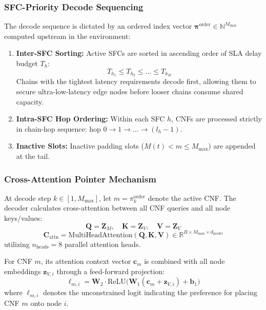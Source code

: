\documentclass[conference]{IEEEtran}
\begin{document}
\subsubsection{SFC-Priority Decode Sequencing}
The decode sequence is dictated by an ordered index vector $\boldsymbol{\pi}^{\text{order}} \in \mathbb{N}^{M_{\max}}$ computed upstream in the environment:
\begin{enumerate}
    \item \textbf{Inter-SFC Sorting:} Active SFCs are sorted in ascending order of SLA delay budget $T_h$:
    \begin{equation}
    T_{h_1} \le T_{h_2} \le \dots \le T_{h_H}
    \end{equation}
    Chains with the tightest latency requirements decode first, allowing them to secure ultra-low-latency edge nodes before looser chains consume shared capacity.
    \item \textbf{Intra-SFC Hop Ordering:} Within each SFC $h$, CNFs are processed strictly in chain-hop sequence: hop $0 \to 1 \to \dots \to (l_h - 1)$.
    \item \textbf{Inactive Slots:} Inactive padding slots ($M(t) < m \le M_{\max}$) are appended at the tail.
\end{enumerate}

\subsubsection{Cross-Attention Pointer Mechanism}
At decode step $k \in [1, M_{\max}]$, let $m = \pi_k^{\text{order}}$ denote the active CNF. The decoder calculates cross-attention between all CNF queries and all node keys/values:
\begin{equation}
\mathbf{Q} = \mathbf{Z}_M, \quad \mathbf{K} = \mathbf{Z}_V, \quad \mathbf{V} = \mathbf{Z}_V
\end{equation}
\begin{equation}
\mathbf{C}_{\text{attn}} = \text{MultiHeadAttention}(\mathbf{Q}, \mathbf{K}, \mathbf{V}) \in \mathbb{R}^{B \times M_{\max} \times d_{\text{model}}}
\end{equation}
utilizing $n_{\text{heads}} = 8$ parallel attention heads.

For CNF $m$, its attention context vector $\mathbf{c}_m$ is combined with all node embeddings $\mathbf{z}_{V, i}$ through a feed-forward projection:
\begin{equation}
\ell_{m, i} = \mathbf{W}_2 \cdot \text{ReLU}\big(\mathbf{W}_1 (\mathbf{c}_m + \mathbf{z}_{V, i}) + \mathbf{b}_1\big)
\label{eq:logits}
\end{equation}
where $\ell_{m, i}$ denotes the unconstrained logit indicating the preference for placing CNF $m$ onto node $i$.
\end{document}
